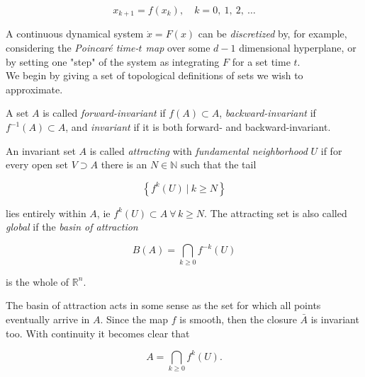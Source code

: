 \begin{equation}
    x_{k+1} = f(x_k), \quad k = 0,\ 1,\ 2,\ \dotsc
\end{equation}

A continuous dynamical system $\dot{x} = F(x)$ can be \emph{discretized} by, for example,
considering the \emph{Poincaré time-$t$ map} over some $d-1$ dimensional hyperplane,
or by setting one "step" of the system as integrating $F$ for a set time $t$. \\

We begin by giving a set of topological definitions of sets we wish to approximate.

\begin{definition}
    \cite*{algGAIO} A set $A$ is called \emph{forward-invariant} if $f(A) \subset A$, 
    \emph{backward-invariant} if $f^{-1}(A) \subset A$, and \emph{invariant} if it is
    both forward- and backward-invariant.
\end{definition}

\begin{definition}
    \cite*{subalg} An invariant set $A$ is called \emph{attracting} with \emph{fundamental neighborhood}
    $U$ if for every open set $V \supset A$ there is an $N \in \mathbb{N}$ such that the tail

    \begin{equation}
        \left\{ f^k(U)\ \vert\ k \geq N \right\}    
    \end{equation}
    
    lies entirely within $A$, ie $f^k(U) \subset A\ \forall\, k \geq N$. The attracting 
    set is also called \emph{global} if the \emph{basin of attraction} 
    
    \begin{equation}
        B(A) = \bigcap\limits_{k \geq 0} f^{-k}(U)
    \end{equation}

    is the whole of $\mathbb{R}^n$.
\end{definition}

The basin of attraction acts in some sense as the set for which all points eventually arrive
in $A$. Since the map $f$ is smooth, then the closure $\bar{A}$ is invariant too. With continuity 
it becomes clear that

\begin{equation}
    A = \bigcap\limits_{k \geq 0} f^k(U).
\end{equation}

